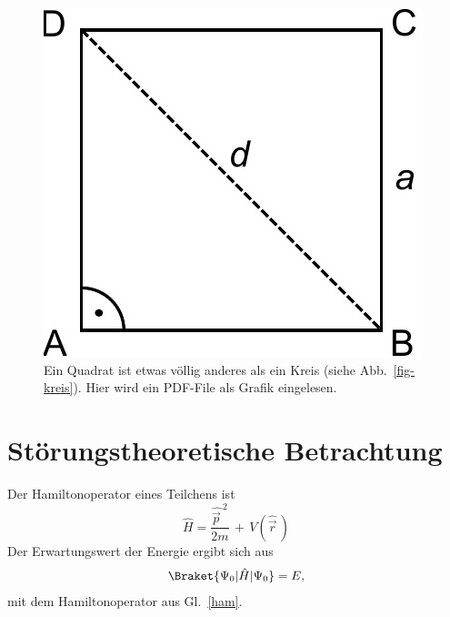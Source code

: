 \begin{figure}[h]
\includegraphics[width=\smallfigwidth]{img/quadrat.pdf}
\caption{Ein Quadrat ist etwas völlig anderes als ein Kreis (siehe Abb.\ \ref{fig-kreis}). 
Hier wird ein PDF-File als Grafik eingelesen.}
\label{fig-quadrat}
\end{figure} 



\section{Störungstheoretische Betrachtung}

Der Hamiltonoperator eines Teilchens ist
\begin{equation}\label{ham}
\hat{H}=\frac{\hat{\vec{p}\,}^2}{2m}\,+\,V(\hat{\vec{r}}\,)
\end{equation}
Der Erwartungswert der Energie ergibt sich aus 
\begin{align}
  \label{gl-erwartungswert}
  \Braket{\Psi_0|\hat H|\Psi_0} = E,
\end{align}
mit dem Hamiltonoperator aus Gl.\ \eqref{ham}.
